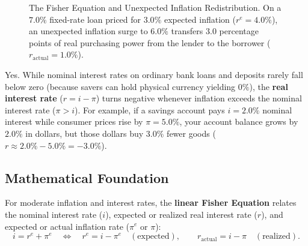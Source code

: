 \documentclass[11pt,letterpaper]{article}
\begin{document}
\begin{figure}[htbp]
\caption{The Fisher Equation and Unexpected Inflation Redistribution. On a $7.0\%$ fixed-rate loan priced for $3.0\%$ expected inflation ($r^e = 4.0\%$), an unexpected inflation surge to $6.0\%$ transfers $3.0$ percentage points of real purchasing power from the lender to the borrower ($r_{\text{actual}} = 1.0\%$).}
\label{fig:fisher_equation_redistribution}
\end{figure}

\begin{coreprinciple}
Yes. While nominal interest rates on ordinary bank loans and deposits rarely fall below zero (because savers can hold physical currency yielding $0\%$), the \textbf{real interest rate} ($r = i - \pi$) turns negative whenever inflation exceeds the nominal interest rate ($\pi > i$). For example, if a savings account pays $i = 2.0\%$ nominal interest while consumer prices rise by $\pi = 5.0\%$, your account balance grows by $2.0\%$ in dollars, but those dollars buy $3.0\%$ fewer goods ($r \approx 2.0\% - 5.0\% = -3.0\%$).
\end{coreprinciple}

\subsection*{Mathematical Foundation}
For moderate inflation and interest rates, the \textbf{linear Fisher Equation} relates the nominal interest rate ($i$), expected or realized real interest rate ($r$), and expected or actual inflation rate ($\pi^e$ or $\pi$):
\begin{equation}
i = r^e + \pi^e \quad \Longleftrightarrow \quad r^e = i - \pi^e \quad (\text{expected}), \qquad r_{\text{actual}} = i - \pi \quad (\text{realized}).
\end{equation}
\end{document}
